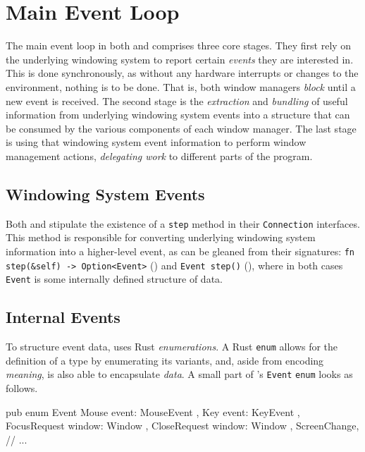 \section{Main Event Loop}

The main event loop  in both \wmrs and \wmcpp comprises  three core stages. They
first rely on the underlying  windowing system to report certain \textit{events}
they are  interested in.  This is  done synchronously,  as without  any hardware
interrupts or changes to  the environment, nothing is to be  done. That is, both
window managers \textit{block}  until a new event is received.  The second stage
is  the \textit{extraction}  and  \textit{bundling} of  useful information  from
underlying windowing system events into a  structure that can be consumed by the
various  components  of each  window  manager.  The  last  stage is  using  that
windowing  system  event  information  to  perform  window  management  actions,
\textit{delegating work} to different parts of the program.

\subsection{Windowing System Events}

Both  \wmrs  and  \wmcpp  stipulate  the existence  of  a  \texttt{step}  method
in  their  \texttt{Connection}  interfaces.   This  method  is  responsible  for
converting underlying windowing system information into a higher-level event, as
can  be  gleaned  from  their signatures:  \texttt{fn  step(&self)  ->
Option<Event>}  (\wmrs) and  \texttt{Event step()}  (\wmcpp), where  in
both cases \texttt{Event} is some internally defined structure of data.

\subsection{Internal Events}


To  structure  event  data,  \wmrs   uses  Rust  \textit{enumerations}.  A  Rust
\texttt{enum}  allows for  the  definition of  a  type by  enumerating
its  variants,  and,   aside  from  encoding  \textit{meaning},   is  also  able
to  encapsulate   \textit{data}\cite{therustbook}.  A  small  part   of  \wmrs's
\texttt{Event} \texttt{enum} looks as follows.

\begin{rustblock}
  pub enum Event {
    Mouse { event: MouseEvent },
    Key { event: KeyEvent },
    FocusRequest { window: Window },
    CloseRequest { window: Window },
    ScreenChange,
    // ...
  }
\end{rustblock}

